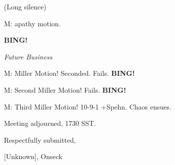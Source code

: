 \documentclass[12pt]{article}
\newcommand{\bing}{{\bf BING!} }
\newcommand{\goto}[1]{\bing \vskip 12pt \centerline{{\em{#1}}}}
\begin{document}
(Long silence)

M: apathy motion.

\goto{Future Business}

M: Miller Motion! Seconded. Fails. \bing

M: Second Miller Motion! Fails. \bing

M: Third Miller Motion! 10-9-1 +Spehn. Chaos ensues.

\vspace{12pt}

\noindent
Meeting adjourned, 1730 SST.

\vspace{18pt}

\centerline{Respectfully submitted,}
\centerline{[Unknown], Onseck}
\end{document}
